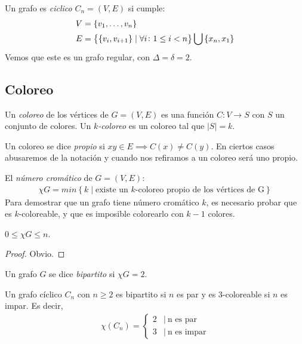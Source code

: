\begin{definition}
Un grafo es \emph{ciclico} $C_n = (V,E)$ si cumple:
\begin{align}
    V &= \left\{v_1,\mathellipsis,v_n\right\}\\
    E &= \left\{ \left\{v_i,v_{i+1}\right\} \mid \forall i \colon 1 \le i < n\right\} \bigcup \left\{x_n,x_1\right\}\\
\end{align}
Vemos que este es un grafo regular, con $\Delta = \delta = 2$.
\end{definition}

\subsection{Coloreo}
\begin{definition}
  Un \emph{coloreo} de los vértices de $G = (V,E)$ es una función
  $C \colon V \to S$ con $S$ un conjunto de colores. Un \emph{$k$-coloreo} es
  un coloreo tal que $|S| = k$.
\end{definition}

\begin{definition}
Un coloreo se dice \emph{propio} si $xy \in E \implies C(x) \neq C(y)$. En ciertos casos abusaremos de la notación y cuando nos refiramos a un coloreo será uno propio.
\end{definition}

\begin{definition}
El \emph{número cromático} de $G = (V,E)$:
\begin{align}
    \chi{G} = min\left\{k \mid \text{existe un $k$-coloreo propio de los vértices de G}\right\}
\end{align}
Para demostrar que un grafo tiene número cromático $k$, es necesario probar que es $k$-coloreable, y que es imposible colorearlo con $k-1$ colores.
\end{definition}

\begin{proposition}
$0 \le \chi{G}\le n$.
\end{proposition}
\begin{proof}
Obvio.
\end{proof}

\begin{definition}
Un grafo $G$ se dice \emph{bipartito} si $\chi{G} = 2$.
\end{definition}

\begin{proposition}\label{graph_cyclic_color}
Un grafo cíclico $C_n$ con $n \ge 2$ es bipartito si $n$ es par y es $3$-coloreable si $n$ es impar. Es decir,
\begin{align}
    \chi(C_n) = 
    \begin{cases}
                2 & |\ \text{n es par} \\
                3 & |\ \text{n es impar}
    \end{cases}
\end{align}
\end{proposition}

